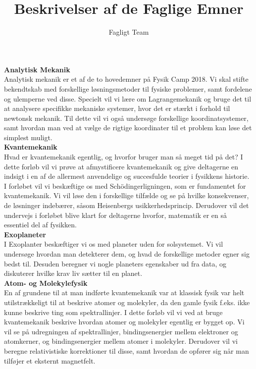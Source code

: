 \documentclass[a4paper,oneside,article]{memoir}
\begin{document}
\title{Beskrivelser af de Faglige Emner}

\author{Fagligt Team}

\maketitle

\textbf{Analytisk Mekanik}\\
Analytisk mekanik er et af de to hovedemner på Fysik Camp 2018. Vi skal stifte bekendtskab med forskellige løsningsmetoder til fysiske problemer, samt fordelene og ulemperne ved disse. Specielt vil vi lære om Lagrangemekanik og bruge det til at analysere specifikke mekaniske systemer, hvor det er stærkt i forhold til newtonsk mekanik. Til dette vil vi også undersøge forskellige koordinatsystemer, samt hvordan man ved at vælge de rigtige koordinater til et problem kan løse det simplest muligt.\\

\textbf{Kvantemekanik}\\
Hvad er kvantemekanik egentlig, og hvorfor bruger man så meget tid på det? I dette forløb vil vi prøve at afmystificere kvantemekanik og give deltagerne en indsigt i en af de allermest anvendelige og succesfulde teorier i fysikkens historie. I forløbet vil vi beskæftige os med Schödingerligningen, som er fundamentet for kvantemekanik. Vi vil løse den i forskellige tilfælde og se på hvilke konsekvenser, de løsninger indebærer, såsom Heisenbergs usikkerhedsprincip. Derudover vil det undervejs i forløbet blive klart for deltagerne hvorfor, matematik er en så essentiel del af fysikken.\\

\textbf{Exoplaneter}\\
I Exoplanter beskæftiger vi os med planeter uden for solsystemet. Vi vil undersøge hvordan man detekterer dem, og hvad de forskellige metoder egner sig bedst til. Desuden beregner vi nogle planeters egenskaber ud fra data, og diskuterer hvilke krav liv sætter til en planet.\\

\textbf{Atom- og Molekylefysik}\\
En af grundene til at man indførte kvantemekanik var at klassisk fysik var helt utilstrækkeligt til at beskrive atomer og molekyler, da den gamle fysik f.eks. ikke kunne beskrive ting som spektrallinjer.
I dette forløb vil vi ved at bruge kvantemekanik beskrive hvordan atomer og molekyler egentlig er bygget op. Vi vil se på udregningen af spektrallinjer, bindingsenergier mellem elektroner og atomkerner, og bindingsenergier mellem atomer i molekyler. Derudover vil vi beregne relativistiske korrektioner til disse, samt hvordan de opfører sig når man tilføjer et eksternt magnetfelt.\\
\end{document}
